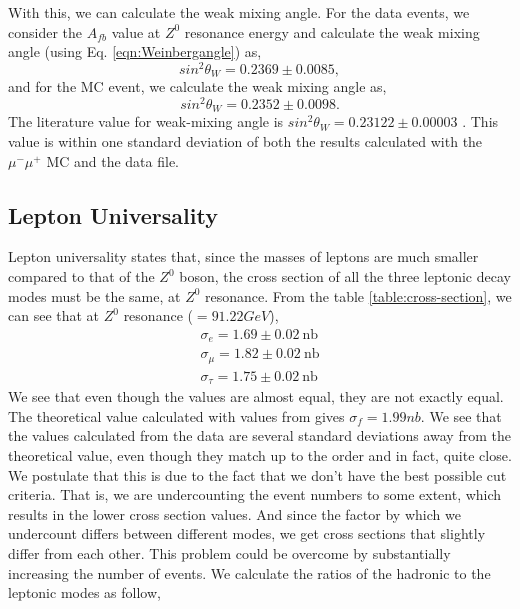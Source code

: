 With this, we can calculate the weak mixing angle. For the data events, we consider the $A_{fb}$ value at $Z^0$ resonance energy and calculate the weak mixing angle (using Eq. \ref{eqn:Weinbergangle}) as,
\begin{equation}
    sin^2\theta_W = 0.2369 \pm 0.0085,
\end{equation}
and for the MC event, we calculate the weak mixing angle as,
\begin{equation}
    sin^2\theta_W = 0.2352 \pm 0.0098.
\end{equation}
The literature value for weak-mixing angle is $sin^2\theta_W = 0.23122 \pm 0.00003$ \cite{pdg-ew}. This value is within one standard deviation of both the results calculated with the $\mu^-\mu^+$ MC and the data file.

\subsection{Lepton Universality}
Lepton universality states that, since the masses of leptons are much smaller compared to that of the $Z^0$ boson, the cross section of all the three leptonic decay modes must be the same, at $Z^0$ resonance. From the table \ref{table:cross-section}, we can see that at $Z^0$ resonance ($=91.22 GeV$),
\begin{equation}
\begin{split}
    \sigma_e = 1.69 \pm 0.02 ~ \text{nb} \\
    \sigma_{\mu} = 1.82 \pm 0.02 ~ \text{nb} \\
    \sigma_{\tau} = 1.75 \pm 0.02 ~ \text{nb}
\end{split}
\end{equation}
We see that even though the values are almost equal, they are not exactly equal. The theoretical value calculated with values from \cite{UB} gives $\sigma_f = 1.99 nb$. We see that the values calculated from the data are several standard deviations away from the theoretical value, even though they match up to the order and in fact, quite close. We postulate that this is due to the fact that we don't have the best possible cut criteria. That is, we are undercounting the event numbers to some extent, which results in the lower cross section values. And since the factor by which we undercount differs between different modes, we get cross sections that slightly differ from each other. This problem could be overcome by substantially increasing the number of events. We calculate the ratios of the hadronic to the leptonic modes as follow,
